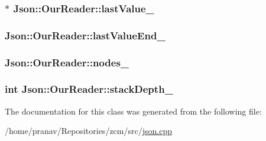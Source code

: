 \subsubsection[{\texorpdfstring{last\+Value\+\_\+}{lastValue_}}]{$\ast$ Json\+::\+Our\+Reader\+::last\+Value\+\_\+\hspace{0.3cm}{\ttfamily [private]}}\hypertarget{classJson_1_1OurReader_a9f994b6a2227c5d96e6ed6cbc74ed251}{}\label{classJson_1_1OurReader_a9f994b6a2227c5d96e6ed6cbc74ed251}
\subsubsection[{\texorpdfstring{last\+Value\+End\+\_\+}{lastValueEnd_}}]{ Json\+::\+Our\+Reader\+::last\+Value\+End\+\_\+\hspace{0.3cm}{\ttfamily [private]}}\hypertarget{classJson_1_1OurReader_a101eadc45e01c60628b53f0db3d13482}{}\label{classJson_1_1OurReader_a101eadc45e01c60628b53f0db3d13482}
\subsubsection[{\texorpdfstring{nodes\+\_\+}{nodes_}}]{ Json\+::\+Our\+Reader\+::nodes\+\_\+\hspace{0.3cm}{\ttfamily [private]}}\hypertarget{classJson_1_1OurReader_a19cc4e8c5d17ee6822f752e9a36f4ce3}{}\label{classJson_1_1OurReader_a19cc4e8c5d17ee6822f752e9a36f4ce3}
\subsubsection[{\texorpdfstring{stack\+Depth\+\_\+}{stackDepth_}}]{\setlength{\rightskip}{0pt plus 5cm}int Json\+::\+Our\+Reader\+::stack\+Depth\+\_\+\hspace{0.3cm}{\ttfamily [private]}}\hypertarget{classJson_1_1OurReader_aaa91c93bc064c7086248ea01eddcf51a}{}\label{classJson_1_1OurReader_aaa91c93bc064c7086248ea01eddcf51a}


The documentation for this class was generated from the following file\+:\begin{DoxyCompactItemize}
\item 
/home/pranav/\+Repositories/zcm/src/\hyperlink{json_8cpp}{json.\+cpp}\end{DoxyCompactItemize}
